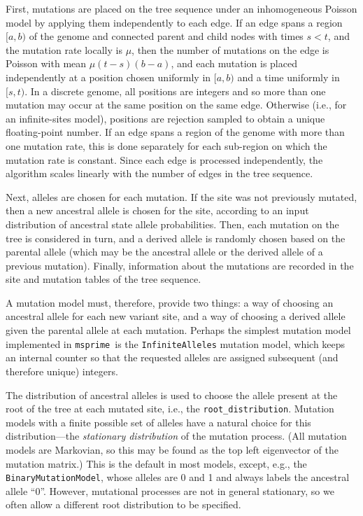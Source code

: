 \documentclass[9pt,twocolumn,twoside,lineno]{gsajnl}
\newcommand{\msprime}[0]{\texttt{msprime}}
\begin{document}
First, mutations are placed on the tree sequence under an inhomogeneous Poisson model
by applying them independently to each edge.
If an edge spans a region $[a, b)$ of the genome
and connected parent and child nodes with times $s < t$,
and the mutation rate locally is $\mu$,
then the number of mutations on the edge is Poisson with mean $\mu (t-s) (b-a)$,
and each mutation is placed independently at a position chosen uniformly in $[a,b)$
and a time uniformly in $[s,t)$.
In a discrete genome, all positions are integers and so more than one mutation
may occur at the same position on the same edge.
Otherwise (i.e., for an infinite-sites model),
positions are rejection sampled to obtain a unique floating-point number.
If an edge spans a region of the genome with more than one mutation rate,
this is done separately for each sub-region on which the mutation rate is constant.
Since each edge is processed independently, the algorithm
scales linearly with the number of edges in the tree sequence.

Next, alleles are chosen for each mutation.
If the site was not previously mutated, then a new ancestral allele is chosen for the site,
according to an input distribution of ancestral state allele probabilities.
Then, each mutation on the tree is considered in turn,
and a derived allele is randomly chosen based on the parental allele
(which may be the ancestral allele or the derived allele of a previous mutation).
Finally, information about the mutations are recorded in the site and mutation tables
of the tree sequence.

A mutation model must, therefore, provide two things:
a way of choosing an ancestral allele for each new variant site,
and a way of choosing a derived allele given the parental allele at each mutation.
Perhaps the simplest mutation model implemented in \msprime\ is the
\texttt{InfiniteAlleles} mutation model,
which keeps an internal counter so that the requested alleles are
assigned subsequent (and therefore unique) integers.

The distribution of ancestral alleles
is used to choose the allele present at the root of the tree at each mutated site,
i.e., the \texttt{root\_distribution}.
Mutation models with a finite possible set of alleles have a natural choice
for this distribution---the \emph{stationary distribution} of the mutation process.
(All mutation models are Markovian,
so this may be found as the top left eigenvector of the mutation matrix.)
This is the default in most models,
except, e.g., the \texttt{BinaryMutationModel}, whose alleles are 0 and 1
and always labels the ancestral allele ``0''.
However, mutational processes are not in general stationary,
so we often allow a different root distribution to be specified.
\end{document}
